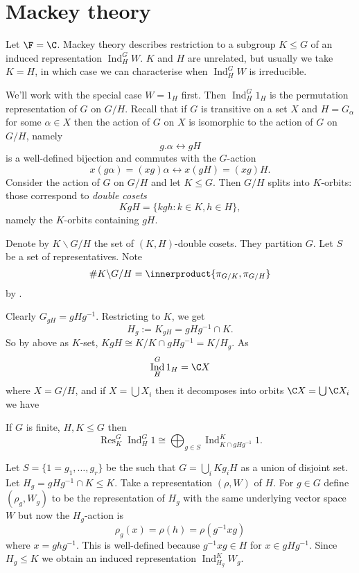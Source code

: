 \documentclass[a4paper]{article}
\newcommand*{\ip}{\innerproduct} %
\DeclareMathOperator{\Res}{Res} %
\DeclareMathOperator{\Ind}{Ind} %
\theoremstyle{definition}
\begin{document}
\section{Mackey theory}

Let \(\F = \C\). Mackey theory describes restriction to a subgroup \(K \leq G\) of an induced representation \(\Ind_H^G W\). \(K\) and \(H\) are unrelated, but usually we take \(K = H\), in which case we can characterise when \(\Ind_H^G W\) is irreducible.

We'll work with the special case \(W = 1_H\) first. Then \(\Ind_H^G 1_H\) is the permutation representation of \(G\) on \(G/H\). Recall that if \(G\) is transitive on a set \(X\) and \(H = G_\alpha\) for some \(\alpha \in X\) then the action of \(G\) on \(X\) is isomorphic to the action of \(G\) on \(G/H\), namely
\[
  g . \alpha \leftrightarrow gH
\]
is a well-defined bijection and commutes with the \(G\)-action
\[
  x(g\alpha) = (xg) \alpha \leftrightarrow x(gH) = (xg)H.
\]
Consider the action of \(G\) on \(G/H\) and let \(K \leq G\). Then \(G/H\) splits into \(K\)-orbits: those correspond to \emph{double cosets}
\[
  KgH = \{kgh: k \in K, h \in H\},
\]
namely the \(K\)-orbits containing \(gH\).

\begin{notation}
  Denote by \(K \backslash G/H\) the set of \((K, H)\)-double cosets. They partition \(G\). Let \(S\) be a set of representatives. Note
  \[
    \# K \backslash G /H = \ip{\pi_{G/K}, \pi_{G/H}}
  \]
  by .
\end{notation}

  Clearly \(G_{gH} = gHg^{-1}\). Restricting to \(K\), we get
  \[
    H_g := K_{gH} = gHg^{-1} \cap K.
  \]
  So by above as \(K\)-set, \(KgH \cong K/K \cap gHg^{-1} = K/H_g\). As
  \[
    \Ind_H^G 1_H = \C X
  \]
where \(X = G/H\), and if \(X = \bigcup X_i\) then it decomposes into orbits \(\C X = \bigcup \C X_i\) we have

\begin{proposition}
  If \(G\) is finite, \(H, K \leq G\) then
  \[
    \Res_K^G \Ind_H^G 1 \cong \bigoplus_{g \in S} \Ind_{K \cap gHg^{-1}}^K 1.
  \]
\end{proposition}

Let \(S = \{1 = g_1, \dots, g_r\}\) be the such that \(G = \bigcup_i Kg_iH\) as a union of disjoint set. Let \(H_g = gHg^{-1} \cap K \leq K\). Take a representation \((\rho, W)\) of \(H\). For \(g \in G\) define \((\rho_g, W_g)\) to be the representation of \(H_g\) with the same underlying vector space \(W\) but now the \(H_g\)-action is
\[
  \rho_g(x) = \rho(h) = \rho(g^{-1}xg)
\]
where \(x = ghg^{-1}\). This is well-defined because \(g^{-1}xg \in H\) for \(x \in gHg^{-1}\). Since \(H_g \leq K\) we obtain an induced representation \(\Ind_{H_g}^K W_g\).
\end{document}
